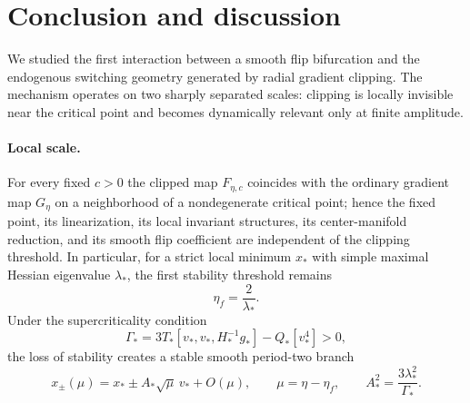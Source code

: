 \section{Conclusion and discussion}
\label{sec:conclusion}

We studied the first interaction between a smooth flip bifurcation
and the endogenous switching geometry generated by radial gradient
clipping.  The mechanism operates on two sharply separated scales:
clipping is locally invisible near the critical point and becomes
dynamically relevant only at finite amplitude.

\paragraph{Local scale.}
For every fixed $c>0$ the clipped map $F_{\eta,c}$ coincides with the
ordinary gradient map $G_\eta$ on a neighborhood of a nondegenerate
critical point; hence the fixed point, its linearization, its local
invariant structures, its center-manifold reduction, and its smooth
flip coefficient are independent of the clipping threshold.  In
particular, for a strict local minimum $x_*$ with simple maximal
Hessian eigenvalue $\lambda_*$, the first stability threshold remains
\begin{equation}
\eta_f
=
\frac{2}{\lambda_*}.
\label{eq:conclusion-eta-f}
\end{equation}
Under the supercriticality condition
\begin{equation}
\Gamma_*
=
3T_*[v_*,v_*,H_*^{-1}g_*]
-
Q_*[v_*^4]
>0,
\label{eq:conclusion-Gamma}
\end{equation}
the loss of stability creates a stable smooth period-two branch
\begin{equation}
x_\pm(\mu)
=
x_*
\pm
A_*\sqrt{\mu}\,v_*
+
O(\mu),
\qquad
\mu=\eta-\eta_f,
\qquad
A_*^2
=
\frac{3\lambda_*^2}{\Gamma_*}.
\label{eq:conclusion-amplitude}
\end{equation}


